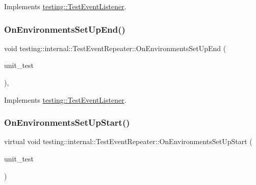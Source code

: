 Implements \mbox{\hyperlink{classtesting_1_1_test_event_listener_aaa1021d75f5dbf3f05c829c1cc520341}{testing\+::\+Test\+Event\+Listener}}.

\mbox{\label{classtesting_1_1internal_1_1_test_event_repeater_a744eeb6ddfcba78b34515fac7f1ab704}} 
\subsubsection{\texorpdfstring{OnEnvironmentsSetUpEnd()}{OnEnvironmentsSetUpEnd()}\hspace{0.1cm}{\footnotesize\ttfamily [3/3]}}
{\footnotesize\ttfamily void testing\+::internal\+::\+Test\+Event\+Repeater\+::\+On\+Environments\+Set\+Up\+End (\begin{DoxyParamCaption}\item[{const \mbox{\hyperlink{classtesting_1_1_unit_test}{Unit\+Test}} \&}]{unit\+\_\+test }\end{DoxyParamCaption})\hspace{0.3cm}{\ttfamily [override]}, {\ttfamily [virtual]}}



Implements \mbox{\hyperlink{classtesting_1_1_test_event_listener_aaa1021d75f5dbf3f05c829c1cc520341}{testing\+::\+Test\+Event\+Listener}}.

\mbox{\label{classtesting_1_1internal_1_1_test_event_repeater_ae71819925adec0471fa7abc5072b8244}} 
\subsubsection{\texorpdfstring{OnEnvironmentsSetUpStart()}{OnEnvironmentsSetUpStart()}\hspace{0.1cm}{\footnotesize\ttfamily [1/3]}}
{\footnotesize\ttfamily virtual void testing\+::internal\+::\+Test\+Event\+Repeater\+::\+On\+Environments\+Set\+Up\+Start (\begin{DoxyParamCaption}\item[{const \mbox{\hyperlink{classtesting_1_1_unit_test}{Unit\+Test}} \&}]{unit\+\_\+test }\end{DoxyParamCaption})\hspace{0.3cm}{\ttfamily [virtual]}}




